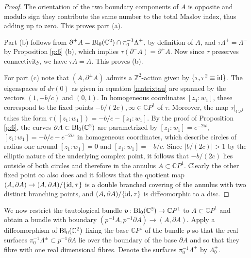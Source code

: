 \documentclass{amsart}
\begin{document}
\begin{proof}
    The orientation of the two boundary components of $A$ is opposite and modulo sign they contribute the same number to the total Maslov index, thus adding up to zero. This proves part (a).

Part (b) follows from $\partial^\pm  A  = {\rm Bl}_0(\mathbb{C}^2) \cap \pi_0^{-1}\Lambda^\pm$, by definition of $A$, and $\tau \Lambda^+=\Lambda^-$ by Proposition \ref{p:6} (b), which implies $\tau (\partial^- A)=\partial^+ A$. Now since $\tau$ preserves connectivity, we have $\tau A=A$. This proves (b). 

For part (c) note that $(A, \partial^\pm A)$ admits a $\mathbb{Z}^2$-action given by $\{ {\tau}, {\tau}^2 \equiv \rm{id}  \}$. The eigenspaces of $d \tau (0)$ as given in equation \eqref{matrixtau} are spanned by the vectors $(1, -b/c)$ and $(0,  1)$. In homogeneous coordinates $[z_1:w_1]$, these correspond to the fixed points $-b/(2c), \infty \in \mathbb{C}P^1 $ of $\tau$. Moreover, the map $\tau|_{\mathbb{C}P^1}$ takes the form  $\tau([z_1:w_1])=-b/c-[z_1:w_1]$. 
By the proof of Proposition \ref{p:6}, the curves $\partial A \subset {\rm Bl}_0(\mathbb{C}^2) $ are parametrized by $[z_1:w_1]=e^{-2it}$,  $[z_1:w_1]=-b/c-e^{-2is}$ in homogeneous coordinates, which describe circles of radius one around $[z_1:w_1]=0$ and $[z_1:w_1]=-b/c$. Since $|b/(2c)| > 1$ by the elliptic nature of the underlying complex point, it follows that $-b/(2c)$ lies outside of both circles and therefore in the annulus $A \subset \mathbb{C}P^1$. Clearly the other fixed point $\infty$ also does and it follows that the quotient map $(A, \partial A) \to (A, \partial A)/\{ \rm{id}, \tau\}$ is a double branched covering of the annulus with two distinct branching points, and $(A, \partial A)/\{ \rm{id}, \tau\}$ is diffeomorphic to a disc.
\end{proof}
\noindent
 We now restrict the tautological bundle $p : {\rm Bl}_0(\mathbb{C}^2) \to \mathbb{C}P^1$ to $A \subset \mathbb{C}P^1$ and obtain a bundle with boundary  $(p^{-1}A, p^{-1}\partial A) \to (A, \partial A)$. Apply a diffeomorphism of ${\rm Bl}_0(\mathbb{C}^2)$ fixing the base $\mathbb{C}P^1$ of the bundle $p$ so that the real surfaces  $ \pi_{0}^{-1}\Lambda^{\pm} \subset p^{-1}\partial A$ lie over the boundary of the base $\partial A$ and so that they fibre with one real dimensional fibres.  Denote the surfaces $ \pi_{0}^{-1}\Lambda^{\pm}$   by $\Lambda_0^\pm$. 
 
\end{document}
